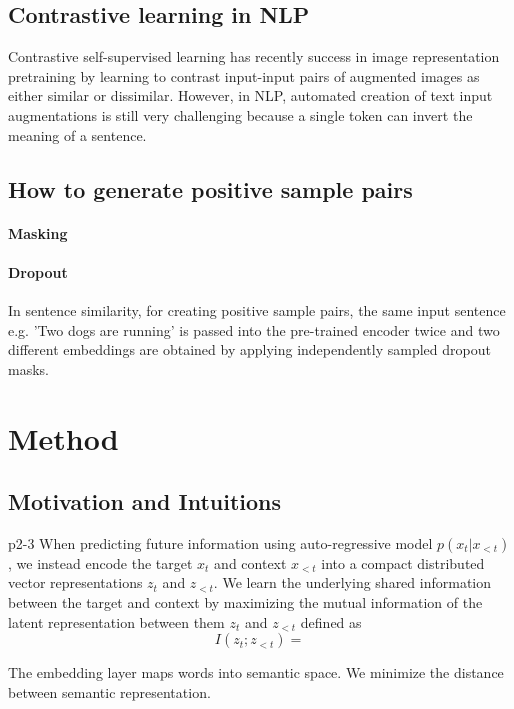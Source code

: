 \documentclass[a4paper]{article}
\begin{document}
	\subsection{Contrastive learning in NLP}
	\cite{rethmeier2021primer}
	Contrastive self-supervised learning has recently success in image representation pretraining by learning to contrast input-input pairs of augmented images as either similar or dissimilar.
	However, in NLP, automated creation of text input augmentations is still very challenging because a single token can invert the meaning of a sentence.

	\subsection{How to generate positive sample pairs}
	\paragraph*{Masking}
	\paragraph*{Dropout} \cite{gao2021simcse} In sentence similarity, for creating positive sample pairs, the same input sentence e.g. 'Two dogs are running' is passed into the pre-trained encoder twice and two different embeddings are obtained by applying independently sampled dropout masks.  

	\section{Method}

	\subsection{Motivation and Intuitions}

	\cite{van2018representation}p2-3
	When predicting future information using auto-regressive model $p(x_t|x_{<t})$, we instead encode the target $x_t$ and context $x_{<t}$ into a compact distributed vector representations $z_t$ and $z_{<t}$.
	We learn the underlying shared information between the target and context by maximizing the mutual information of the latent representation between them $z_t$ and $z_{<t}$ defined as
	\begin{equation}
		I(z_t; z_{<t}) = 
	\end{equation}

	The embedding layer maps words into semantic space. We minimize the distance between semantic representation.


	
		
\end{document}
